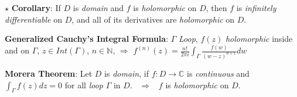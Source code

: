 \documentclass[9pt]{article}
\begin{document}
\quad $\star$   \textbf{Corollary}: {\small If $D$ is \textit{domain} and $f$ is \textit{holomorphic} on $D$, then $f$ is \textit{infinitely differentiable} on $D$, and all of its derivatives are \textit{holomorphic} on $D$.}

\textbf{Generalized Cauchy's Integral Formula}: {\footnotesize $\Gamma$ \textit{Loop}, $f(z)$ \textit{holomorphic} inside and on $\Gamma$, $z\in Int(\Gamma)$, $n\in\mathbb{N}$,} \quad $\Rightarrow$ \quad $f^{(n)}(z)=\frac{n!}{2\pi i}\int_{\Gamma}\frac{f(w)}{(w-z)^{n+1}}dw$


\textbf{Morera Theorem}: Let $D$ is \textit{domain}, if $f:D\to\mathbb{C}$ is \textit{continuous} and $\int_{\Gamma}f(z)dz=0$ for all \textit{loop} $\Gamma$ in $D$. \ $\Rightarrow$ \ $f$ is \textit{holomorphic} on $D$.
\end{document}
